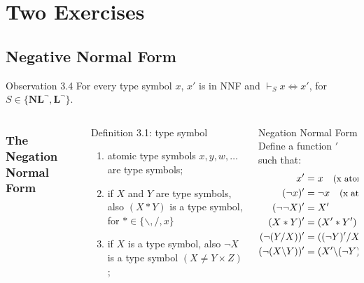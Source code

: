 \documentclass{beamer}
\begin{document}
\section{Two Exercises}
\subsection{Negative Normal Form}

\begin{frame}


\begin{alertblock}{Observation 3.4}
For every type symbol $x$, $x'$ is in NNF and $\vdash_S x \Leftrightarrow x'$, for $S \in \{\textbf{NL}^\neg , \textbf{L}^\neg \}$.
\end{alertblock}  
\begin{columns}
\frametitle{The Negation Normal Form}
\begin{column}{0.4 \textwidth}
\begin{exampleblock}{Definition 3.1: type symbol}
  \begin{enumerate}
    \item atomic type symbols $x,y,w,\dots$ are type symbols;
    \item if $X$ and $Y$ are type symbols, also $(X * Y)$ is a type symbol, for $ * \in \{ \backslash , / , x \}$
    \item if $X$ is a type symbol, also $\neg X$ is a type symbol $( X \neq Y \times Z)$;
  \end{enumerate}
\end{exampleblock}
\end{column}

  \begin{column}{0.4 \textwidth}
  \begin{exampleblock}{Negation Normal Form}
  Define a function $'$ such that:
  \begin{align*}
    x' &= x \quad \text{\small (x atomic)}\\
    (\neg x)' &= \neg x \quad \text{\small (x atomic)}\\
    (\neg\neg X)' &= X' \\
    (X * Y)' &= (X' * Y') \\
    (\neg(Y/X))' &= ((\neg Y)'/X') \\
    (\neg (X\backslash Y))' &= (X' \backslash (\neg Y)')
  \end{align*}   
    \end{exampleblock} 
  \end{column}

\end{columns}
  
\end{frame}
\end{document}

